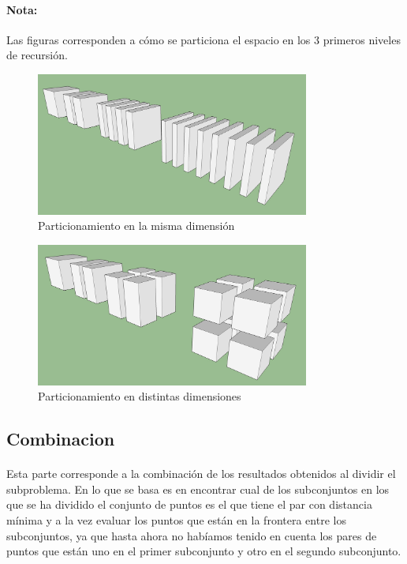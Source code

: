 \documentclass{article}
\begin{document}
		\paragraph{Nota:}
		Las figuras corresponden a cómo se particiona el espacio en los 3 primeros niveles de recursión.



	\begin{figure}[ht!]
		\centering
		\includegraphics[width=90mm]{cube_division_1.jpg}
		\caption{Particionamiento en la misma dimensión \label{same_dim}}
	\end{figure}

	\begin{figure}[ht!]
		\centering
		\includegraphics[width=90mm]{cube_division_2.jpg}
		\caption{Particionamiento en distintas dimensiones \label{different_dim}}
	\end{figure}


	\subsection{Combinacion}
		\paragraph{}
		Esta parte corresponde a la combinación de los resultados obtenidos al dividir el subproblema. En lo que se basa es en encontrar cual de los subconjuntos en los que se ha dividido el conjunto de puntos es el que tiene el par con distancia mínima y a la vez evaluar los puntos que están en la frontera entre los subconjuntos, ya que hasta ahora no habíamos tenido en cuenta los pares de puntos que están uno en el primer subconjunto y otro en el segundo subconjunto.
		
\end{document}
